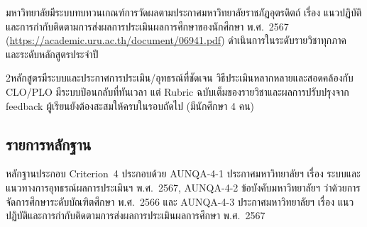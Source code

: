 มหาวิทยาลัยมีระบบทบทวนเกณฑ์การวัดผลตามประกาศมหาวิทยาลัยราชภัฏอุตรดิตถ์ เรื่อง แนวปฏิบัติและการกำกับติดตามการส่งผลการประเมินผลการศึกษาของนักศึกษา พ.ศ.~2567 (\url{https://academic.uru.ac.th/document/06941.pdf}) ดำเนินการในระดับรายวิชาทุกภาค และระดับหลักสูตรประจำปี

\begin{selfassessmentbox}{2}{หลักสูตรมีระบบและประกาศการประเมิน/อุทธรณ์ที่ชัดเจน วิธีประเมินหลากหลายและสอดคล้องกับ CLO/PLO มีระบบป้อนกลับที่ทันเวลา แต่ Rubric ฉบับเต็มของรายวิชาและผลการปรับปรุงจาก feedback ผู้เรียนยังต้องสะสมให้ครบในรอบถัดไป (มีนักศึกษา 4 คน)}
\end{selfassessmentbox}

\subsection*{รายการหลักฐาน}

หลักฐานประกอบ Criterion~4 ประกอบด้วย AUNQA-4-1 ประกาศมหาวิทยาลัยฯ เรื่อง ระบบและแนวทางการอุทธรณ์ผลการประเมินฯ พ.ศ.~2567, AUNQA-4-2 ข้อบังคับมหาวิทยาลัยฯ ว่าด้วยการจัดการศึกษาระดับบัณฑิตศึกษา พ.ศ.~2566 และ AUNQA-4-3 ประกาศมหาวิทยาลัยฯ เรื่อง แนวปฏิบัติและการกำกับติดตามการส่งผลการประเมินผลการศึกษา พ.ศ.~2567
